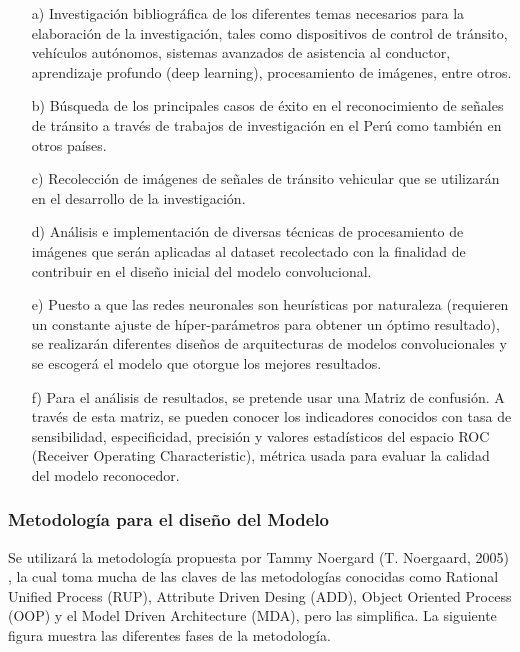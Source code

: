 		\begin{enumerate}

		\item[a)]	Investigación bibliográfica de los diferentes temas necesarios para la elaboración de la investigación, tales como dispositivos de control de tránsito, vehículos autónomos, sistemas avanzados de asistencia al conductor, aprendizaje profundo (deep learning), procesamiento de imágenes, entre otros.
		
		\item[b)]	Búsqueda de los principales casos de éxito en el reconocimiento de señales de tránsito a través de trabajos de investigación en el Perú como también en otros países.

		\item[c)]	Recolección de imágenes de señales de tránsito vehicular que se utilizarán en el desarrollo de la investigación.

		\item[d)]	Análisis e implementación de diversas técnicas de procesamiento de imágenes que serán aplicadas al dataset recolectado con la finalidad de contribuir en el diseño inicial del modelo convolucional.

		\item[e)]	Puesto a que las redes neuronales son heurísticas por naturaleza (requieren un constante ajuste de híper-parámetros para obtener un óptimo resultado), se realizarán diferentes diseños de arquitecturas de modelos convolucionales y se escogerá el modelo que otorgue los mejores resultados.
		
		\item[f)]	Para el análisis de resultados, se pretende usar una Matriz de confusión. A través de esta matriz, se pueden conocer los indicadores conocidos con tasa de sensibilidad, especificidad, precisión y valores estadísticos del espacio ROC (Receiver Operating Characteristic), métrica usada para evaluar la calidad del modelo reconocedor.
		
		\end{enumerate}

		\subsubsection{Metodología para el diseño del Modelo}

			Se utilizará la metodología propuesta por Tammy Noergard (T. Noergaard, 2005) , la cual toma mucha de las claves de las metodologías conocidas como Rational Unified Process (RUP), Attribute Driven Desing (ADD), Object Oriented Process (OOP) y el Model Driven Architecture (MDA), pero las simplifica. La siguiente figura muestra las diferentes fases de la metodología.
			
